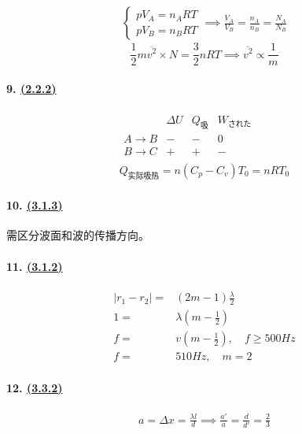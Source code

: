 \begin{gather*}
    \begin{cases}
        pV_A=n_ART\\
        pV_B=n_BRT
    \end{cases}\implies
    \frac{V_A}{V_B}=\frac{n_A}{n_B}=\frac{N_A}{N_B}
\end{gather*}
\begin{equation*}
    \frac12m\overline{v^2}\times N=\frac32nRT\implies
    \overline{v^2}\propto\frac1m
\end{equation*}

\paragraph{9. \hyperref[subsec:2.2.2]{(2.2.2)}}

\begin{gather*}
    \begin{array}{c|ccc}
        & \Delta U & Q_\textrm{吸} & W_\textrm{された} \\\hline
        A\to B & - & - & 0 \\
        B\to C & + & + & -
    \end{array}\\
    Q_\textrm{实际吸热}=n(C_p-C_v)T_0=nRT_0
\end{gather*}

\paragraph{10. \hyperref[subsec:3.1.3]{(3.1.3)}} 需区分波面和波的传播方向。
\paragraph{11. \hyperref[subsec:3.1.2]{(3.1.2)}}

\begin{align*}
    |r_1-r_2|=&(2m-1)\frac\lambda2\\
    1=&\lambda\left(m-\frac12\right)\\
    f=&v\left(m-\frac12\right),\quad f\ge500Hz\\
    f=&510Hz,\quad m=2
\end{align*}

\paragraph{12. \hyperref[subsec:3.3.2]{(3.3.2)}}

\begin{gather*}
    a=\Delta x=\frac{\lambda l}{d}\implies
    \frac{a'}{a}=\frac{d}{d'}=\frac23
\end{gather*}

